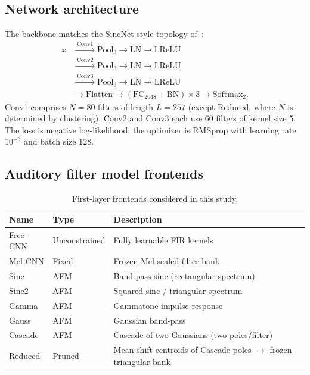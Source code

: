 \documentclass[11pt,a4paper]{article}
\begin{document}
\subsection{Network architecture}

The backbone matches the SincNet-style topology of~\cite{fayyazi2023}:
\begin{align*}
  x &\xrightarrow{\;\mathrm{Conv1}\;} \mathrm{Pool}_3 \to \mathrm{LN} \to \mathrm{LReLU}\\
    &\xrightarrow{\;\mathrm{Conv2}\;} \mathrm{Pool}_3 \to \mathrm{LN} \to \mathrm{LReLU}\\
    &\xrightarrow{\;\mathrm{Conv3}\;} \mathrm{Pool}_3 \to \mathrm{LN} \to \mathrm{LReLU}\\
    &\to \mathrm{Flatten} \to (\mathrm{FC}_{2048}+\mathrm{BN})\times 3 \to \mathrm{Softmax}_2.
\end{align*}
Conv1 comprises $N{=}80$ filters of length $L{=}257$ (except Reduced, where $N$ is determined by clustering). Conv2 and Conv3 each use 60 filters of kernel size 5. The loss is negative log-likelihood; the optimizer is RMSprop with learning rate $10^{-3}$ and batch size 128.

\subsection{Auditory filter model frontends}

\begin{table}[H]
\centering
\caption{First-layer frontends considered in this study.}
\label{tab:frontends}
\begin{tabular}{@{}llp{7.2cm}@{}}
\toprule
\textbf{Name} & \textbf{Type} & \textbf{Description} \\
\midrule
Free-CNN & Unconstrained & Fully learnable FIR kernels \\
Mel-CNN  & Fixed         & Frozen Mel-scaled filter bank \\
Sinc     & AFM           & Band-pass sinc (rectangular spectrum) \\
Sinc2    & AFM           & Squared-sinc / triangular spectrum \\
Gamma    & AFM           & Gammatone impulse response \\
Gauss    & AFM           & Gaussian band-pass \\
Cascade  & AFM           & Cascade of two Gaussians (two poles/filter) \\
Reduced  & Pruned        & Mean-shift centroids of Cascade poles $\to$ frozen triangular bank \\
\bottomrule
\end{tabular}
\end{table}
\end{document}
